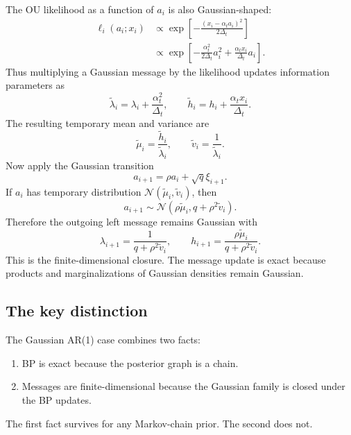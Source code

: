 \documentclass[11pt]{article}
\newcommand{\Normal}{\mathcal{N}}
\begin{document}
The OU likelihood as a function of \(a_i\) is also Gaussian-shaped:
\begin{align}
  \ell_i(a_i;x_i)
  &\propto
  \exp\left[-\frac{(x_i-\alpha_t a_i)^2}{2\Delta_t}\right]\\
  &\propto
  \exp\left[-\frac{\alpha_t^2}{2\Delta_t}a_i^2
  +\frac{\alpha_t x_i}{\Delta_t}a_i\right].
\end{align}
Thus multiplying a Gaussian message by the likelihood updates information parameters as
\begin{equation}
  \widetilde\lambda_i=\lambda_i+\frac{\alpha_t^2}{\Delta_t},
  \qquad
  \widetilde h_i=h_i+\frac{\alpha_t x_i}{\Delta_t}.
  \label{eq:likelihoodupdate}
\end{equation}
The resulting temporary mean and variance are
\begin{equation}
  \widetilde\mu_i=\frac{\widetilde h_i}{\widetilde\lambda_i},
  \qquad
  \widetilde v_i=\frac{1}{\widetilde\lambda_i}.
\end{equation}
Now apply the Gaussian transition
\begin{equation}
  a_{i+1}=\rho a_i+\sqrt q\xi_{i+1}.
\end{equation}
If \(a_i\) has temporary distribution \(\Normal(\widetilde\mu_i,\widetilde v_i)\), then
\begin{equation}
  a_{i+1}\sim\Normal(\rho\widetilde\mu_i, q+\rho^2\widetilde v_i).
\end{equation}
Therefore the outgoing left message remains Gaussian with
\begin{equation}
  \lambda_{i+1}=\frac{1}{q+\rho^2\widetilde v_i},
  \qquad
  h_{i+1}=\frac{\rho\widetilde\mu_i}{q+\rho^2\widetilde v_i}.
\end{equation}
This is the finite-dimensional closure. The message update is exact because products and marginalizations of Gaussian densities remain Gaussian.

\subsection{The key distinction}

The Gaussian AR(1) case combines two facts:
\begin{enumerate}[label=\arabic*.]
  \item BP is exact because the posterior graph is a chain.
  \item Messages are finite-dimensional because the Gaussian family is closed under the BP updates.
\end{enumerate}
The first fact survives for any Markov-chain prior. The second does not.
\end{document}
